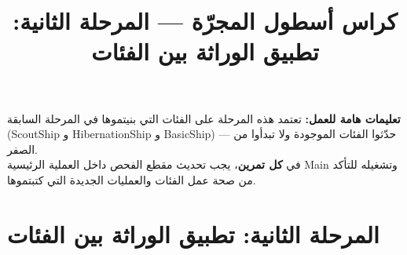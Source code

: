 \documentclass[14pt]{extarticle}
\title{كراس أسطول المجرّة — المرحلة الثانية: تطبيق الوراثة بين الفئات}
\begin{document}
\maketitle
\thispagestyle{fancy}

\begin{boxWarning}
\textbf{تعليمات هامة للعمل:}
تعتمد هذه المرحلة على الفئات التي بنيتموها في المرحلة السابقة (\textenglish{ScoutShip} و \textenglish{HibernationShip} و \textenglish{BasicShip}) — حدّثوا الفئات الموجودة ولا تبدأوا من الصفر. \\
في \textbf{كل تمرين}، يجب تحديث مقطع الفحص داخل العملية الرئيسية \textenglish{Main} وتشغيله للتأكد من صحة عمل الفئات والعمليات الجديدة التي كتبتموها.
\end{boxWarning}

\section*{المرحلة الثانية: تطبيق الوراثة بين الفئات}
\end{document}
